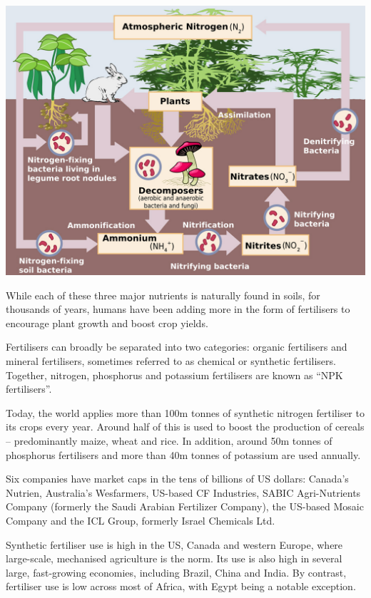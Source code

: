 \documentclass[
]{book}
\begin{document}
\includegraphics{fig/nitrogen-cycle.jpg}

While each of these three major nutrients is naturally found in soils, for thousands of years, humans have been adding more in the form of fertilisers to encourage plant growth and boost crop yields.

Fertilisers can broadly be separated into two categories: organic fertilisers and mineral fertilisers, sometimes referred to as chemical or synthetic fertilisers. Together, nitrogen, phosphorus and potassium fertilisers are known as ``NPK fertilisers''.

Today, the world applies more than 100m tonnes of synthetic nitrogen fertiliser to its crops every year.
Around half of this is used to boost the production of cereals -- predominantly maize, wheat and rice. In addition, around 50m tonnes of phosphorus fertilisers and more than 40m tonnes of potassium are used annually.

Six companies have market caps in the tens of billions of US dollars: Canada's Nutrien, Australia's Wesfarmers, US-based CF Industries, SABIC Agri-Nutrients Company (formerly the Saudi Arabian Fertilizer Company), the US-based Mosaic Company and the ICL Group, formerly Israel Chemicals Ltd.

Synthetic fertiliser use is high in the US, Canada and western Europe, where large-scale, mechanised agriculture is the norm. Its use is also high in several large, fast-growing economies, including Brazil, China and India. By contrast, fertiliser use is low across most of Africa, with Egypt being a notable exception.
\end{document}

